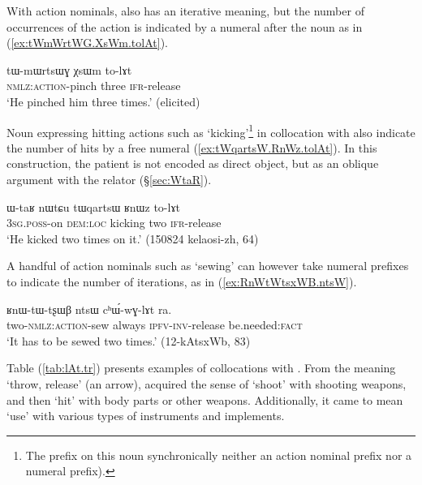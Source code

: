 With  action nominals,  also has an iterative meaning, but the number of occurrences of the action is indicated by a numeral after the noun as in (\ref{ex:tWmWrtWG.XsWm.tolAt}).

\begin{exe}
\ex \label{ex:tWmWrtWG.XsWm.tolAt}
\gll tɯ-mɯrtsɯɣ χsɯm to-lɤt \\
\textsc{nmlz}:\textsc{action}-pinch three \textsc{ifr}-release \\
\glt `He pinched him three times.' (elicited)
\end{exe}

Noun expressing hitting actions such as  `kicking'\footnote{The  prefix on this noun synchronically neither an action nominal prefix nor a numeral prefix). } in collocation with  also indicate the number of hits by a free numeral (\ref{ex:tWqartsW.RnWz.tolAt}). In this construction, the patient is not encoded as direct object, but as an oblique argument with the relator  (§\ref{sec:WtaR}).

\begin{exe}
\ex \label{ex:tWqartsW.RnWz.tolAt}
\gll ɯ-taʁ nɯtɕu tɯqartsɯ ʁnɯz to-lɤt \\
\textsc{3sg}.\textsc{poss}-on \textsc{dem}:\textsc{loc} kicking two \textsc{ifr}-release \\
\glt `He kicked two times on it.'  (150824 kelaosi-zh, 64)
\end{exe}

A handful of action nominals such as  `sewing' can however take numeral prefixes to indicate the number of iterations, as in (\ref{ex:RnWtWtsxWB.ntsW}).
 
\begin{exe}
\ex \label{ex:RnWtWtsxWB.ntsW}
\gll ʁnɯ-tɯ-tʂɯβ ntsɯ cʰɯ́-wɣ-lɤt ra.   \\
two-\textsc{nmlz}:\textsc{action}-sew always \textsc{ipfv}-\textsc{inv}-release be.needed:\textsc{fact} \\
\glt `It has to be sewed two times.' (12-kAtsxWb, 83)
\end{exe}
 
Table (\ref{tab:lAt.tr}) presents examples of collocations with . From the meaning `throw, release' (an arrow),  acquired the sense of `shoot' with shooting weapons, and then `hit' with body parts or other weapons. Additionally, it came to mean `use' with various types of instruments and implements.
 
